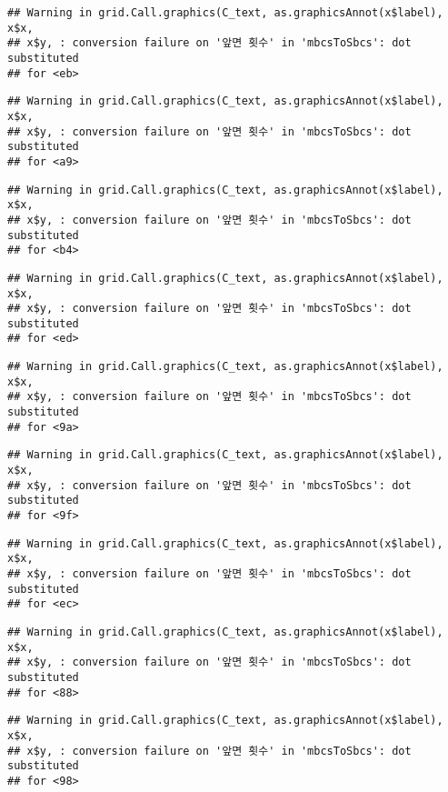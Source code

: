 \documentclass[]{book}
\begin{document}
\begin{verbatim}
## Warning in grid.Call.graphics(C_text, as.graphicsAnnot(x$label), x$x,
## x$y, : conversion failure on '앞면 횟수' in 'mbcsToSbcs': dot substituted
## for <eb>
\end{verbatim}

\begin{verbatim}
## Warning in grid.Call.graphics(C_text, as.graphicsAnnot(x$label), x$x,
## x$y, : conversion failure on '앞면 횟수' in 'mbcsToSbcs': dot substituted
## for <a9>
\end{verbatim}

\begin{verbatim}
## Warning in grid.Call.graphics(C_text, as.graphicsAnnot(x$label), x$x,
## x$y, : conversion failure on '앞면 횟수' in 'mbcsToSbcs': dot substituted
## for <b4>
\end{verbatim}

\begin{verbatim}
## Warning in grid.Call.graphics(C_text, as.graphicsAnnot(x$label), x$x,
## x$y, : conversion failure on '앞면 횟수' in 'mbcsToSbcs': dot substituted
## for <ed>
\end{verbatim}

\begin{verbatim}
## Warning in grid.Call.graphics(C_text, as.graphicsAnnot(x$label), x$x,
## x$y, : conversion failure on '앞면 횟수' in 'mbcsToSbcs': dot substituted
## for <9a>
\end{verbatim}

\begin{verbatim}
## Warning in grid.Call.graphics(C_text, as.graphicsAnnot(x$label), x$x,
## x$y, : conversion failure on '앞면 횟수' in 'mbcsToSbcs': dot substituted
## for <9f>
\end{verbatim}

\begin{verbatim}
## Warning in grid.Call.graphics(C_text, as.graphicsAnnot(x$label), x$x,
## x$y, : conversion failure on '앞면 횟수' in 'mbcsToSbcs': dot substituted
## for <ec>
\end{verbatim}

\begin{verbatim}
## Warning in grid.Call.graphics(C_text, as.graphicsAnnot(x$label), x$x,
## x$y, : conversion failure on '앞면 횟수' in 'mbcsToSbcs': dot substituted
## for <88>
\end{verbatim}

\begin{verbatim}
## Warning in grid.Call.graphics(C_text, as.graphicsAnnot(x$label), x$x,
## x$y, : conversion failure on '앞면 횟수' in 'mbcsToSbcs': dot substituted
## for <98>
\end{verbatim}
\end{document}
